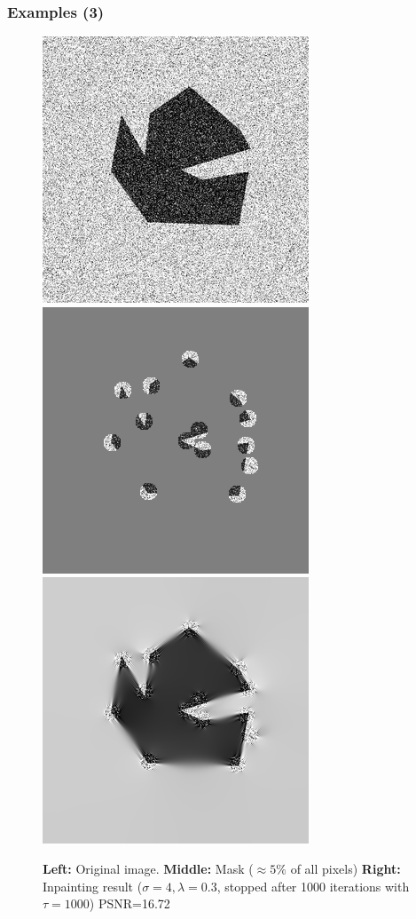 \documentclass{beamer}
\newcommand{\backupend}{
   \addtocounter{framenumberappendix}{-\value{framenumber}}
   \addtocounter{framenumber}{\value{framenumberappendix}} 
}
\begin{document}
    \begin{frame}
        \frametitle{Examples (3)}
        \begin{figure}
             \centering
             \includegraphics[width=0.3\linewidth]{../images/binary/abstract1_noise.png}
             \includegraphics[width=0.3\linewidth]{../thesis/Images/abstract1_noise_mask.png}
             \includegraphics[width=0.3\linewidth]{../thesis/Images/abstract1_noise_inpaint.png}
             \caption{\textbf{Left:} Original image. \textbf{Middle:} Mask ($\approx5\%$ of all
                 pixels) \textbf{Right:} Inpainting result
             ($\sigma=4,\lambda=0.3$, stopped after 1000 iterations with $\tau=1000$) PSNR=16.72}
        \end{figure}    
    \end{frame}
    \backupend
\end{document}
